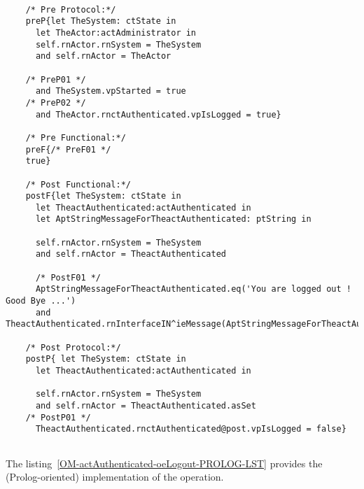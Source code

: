 	\scriptsize
	\vspace{0.5cm}
	\begin{lstlisting}[style=MessirStyle,firstnumber=auto,captionpos=b,caption={\msrmessir (MCL-oriented) specification of the operation \emph{oeLogout}.},label=OM-actAuthenticated-oeLogout-MCL-LST]

	/* Pre Protocol:*/ 
	preP{let TheSystem: ctState in
	  let TheActor:actAdministrator in
	  self.rnActor.rnSystem = TheSystem
	  and self.rnActor = TheActor
	  
	/* PreP01 */
	  and TheSystem.vpStarted = true
	/* PreP02 */
	  and TheActor.rnctAuthenticated.vpIsLogged = true}
	
	/* Pre Functional:*/
	preF{/* PreF01 */
	true}
	
	/* Post Functional:*/ 
	postF{let TheSystem: ctState in
	  let TheactAuthenticated:actAuthenticated in
	  let AptStringMessageForTheactAuthenticated: ptString in
	  
	  self.rnActor.rnSystem = TheSystem
	  and self.rnActor = TheactAuthenticated
	  
	  /* PostF01 */
	  AptStringMessageForTheactAuthenticated.eq('You are logged out ! Good Bye ...')
	  and TheactAuthenticated.rnInterfaceIN^ieMessage(AptStringMessageForTheactAuthenticated)}
	
	/* Post Protocol:*/ 
	postP{ let TheSystem: ctState in
	  let TheactAuthenticated:actAuthenticated in
	
	  self.rnActor.rnSystem = TheSystem
	  and self.rnActor = TheactAuthenticated.asSet
	/* PostP01 */
	  TheactAuthenticated.rnctAuthenticated@post.vpIsLogged = false}
	
	\end{lstlisting}
	\normalsize 
	
	
	
	
	
	\vspace{1cm}
	The listing~\ref{OM-actAuthenticated-oeLogout-PROLOG-LST} provides the \msrmessir (Prolog-oriented) implementation of the operation.
	
	\scriptsize
	\vspace{0.5cm}
	
	
	\normalsize





